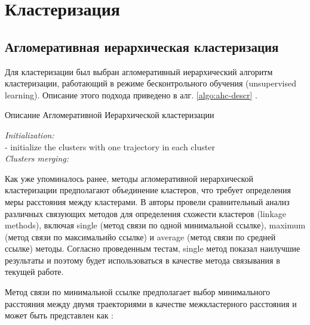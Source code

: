 \section{Кластеризация}

\subsection{Агломеративная иерархическая кластеризация}

Для кластеризации был выбран агломеративный иерархический алгоритм кластеризации, работающий в режиме бесконтрольного обучения (unsupervised learning). Описание этого подхода приведено в алг. \ref{algo:ahc-descr} \cite{inproceedings:7_related_work}.

\begin{algorithm}[!htb]
	\caption{Описание Агломеративной Иерархической кластеризации}
	\label{algo:ahc-descr}
	\SetAlgoLined
	\textit{Initialization:} \\
	- initialize the clusters with one trajectory in each cluster \\
	\textit{Clusters merging:}\\
\end{algorithm}

Как уже упоминалось ранее, методы агломеративной иерархической кластеризации предполагают объединение кластеров, что требует определения меры расстояния между кластерами. В \cite{inproceedings:7_related_work} авторы провели сравнительный анализ различных связующих методов для определения схожести кластеров (linkage methods), включая single (метод связи по одной минимальной ссылке), maximum (метод связи по максимальнйо ссылке) и average (метод связи по средней ссылке) методы. Согласно проведенным тестам, single метод показал наилучшие результаты и поэтому будет использоваться в качестве метода связывания в текущей работе.

Метод связи по минимальной ссылке предполагает выбор минимального расстояния между двумя траекториями в качестве межкластерного расстояния и может быть представлен как \cite{inproceedings:7_related_work}:

